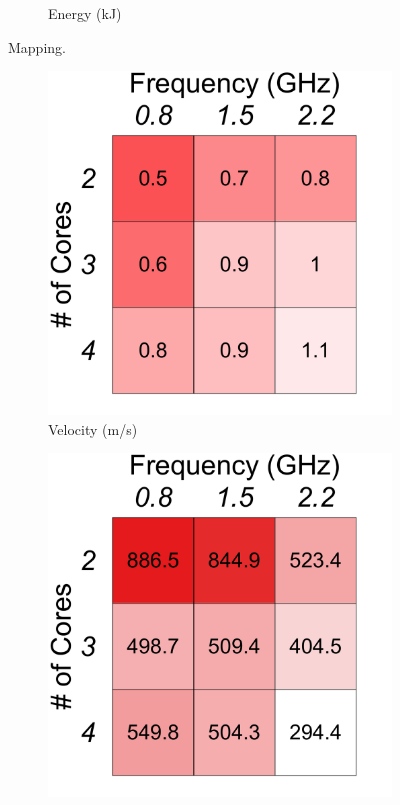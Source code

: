 {\begin{figure}[t!]
\begin{subfigure}[t!]{.3\columnwidth}
    \caption{Energy (kJ)}
     \label{fig:benchmarks:OPA:mapping:energy}
    \end{subfigure}
    \caption{Mapping.}
    \label{fig:benchmarks:OPA:mapping}
    \end{figure}%
    \begin{figure}[t!]
    \centering
    \begin{subfigure}[t!]{.3\columnwidth}
    \centering
    \includegraphics[width=\columnwidth]{figs/SAR_velocity_operating_point}
    \caption{Velocity (m/s)}
     \label{fig:benchmarks:OPA:sar:velocity}
    \end{subfigure}
    \begin{subfigure}[t!]{.3\columnwidth}
    \centering
    \includegraphics[width=\columnwidth]{figs/SAR_flight_time_operating_point}

\end{subfigure}
\end{figure}}
